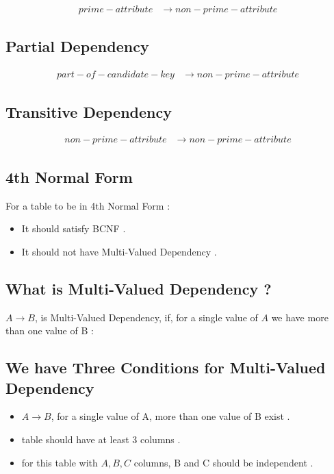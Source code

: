 \documentclass[10pt]{article}
\begin{document}
\begin{align*}
prime-attribute &\to non-prime-attribute 
\end{align*}


\subsection{Partial Dependency}


\begin{align*}
part-of-candidate-key &\to non-prime-attribute 
\end{align*}



\subsection{Transitive Dependency}

\begin{align*}
non-prime-attribute &\to non-prime-attribute 
\end{align*}



\subsection{4th Normal Form}

For a table to be in 4th Normal Form :

\begin{itemize}
	\item It should satisfy BCNF .
	\item It should not have Multi-Valued Dependency .
\end{itemize}


\subsection{What is Multi-Valued Dependency ?}

$A \to B$, is Multi-Valued Dependency, if, for a single value of $A$ we have more than one value of B :

\begin{center}
\end{center}



\subsection{We have Three Conditions for Multi-Valued Dependency}

\begin{itemize}
	\item $A \to B$, for a single value of A, more than one value of B exist .
	\item table should have at least 3 columns .
	\item for this table with $A, B, C$ columns, B and C should be independent .
\end{itemize}
\end{document}
